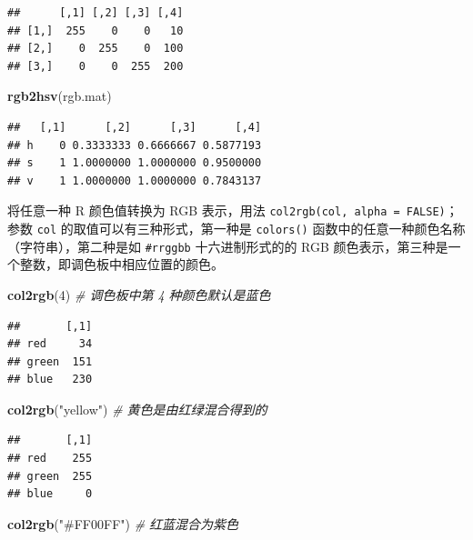 \documentclass[
  b5paper,
  UTF8,twoside]{book}
\newenvironment{Shaded}{\begin{snugshade}}{\end{snugshade}}
\newcommand{\CommentTok}[1]{\textcolor[rgb]{0.56,0.35,0.01}{\textit{#1}}}
\newcommand{\DecValTok}[1]{\textcolor[rgb]{0.00,0.00,0.81}{#1}}
\newcommand{\FunctionTok}[1]{\textcolor[rgb]{0.13,0.29,0.53}{\textbf{#1}}}
\newcommand{\NormalTok}[1]{#1}
\newcommand{\StringTok}[1]{\textcolor[rgb]{0.31,0.60,0.02}{#1}}
\providecommand{\tightlist}{%
  \setlength{\itemsep}{0pt}\setlength{\parskip}{0pt}}
\begin{document}
\begin{verbatim}
##      [,1] [,2] [,3] [,4]
## [1,]  255    0    0   10
## [2,]    0  255    0  100
## [3,]    0    0  255  200
\end{verbatim}

\begin{Shaded}
\begin{Highlighting}[]
\FunctionTok{rgb2hsv}\NormalTok{(rgb.mat)}
\end{Highlighting}
\end{Shaded}

\begin{verbatim}
##   [,1]      [,2]      [,3]      [,4]
## h    0 0.3333333 0.6666667 0.5877193
## s    1 1.0000000 1.0000000 0.9500000
## v    1 1.0000000 1.0000000 0.7843137
\end{verbatim}

\begin{description}
\tightlist
\item[\texttt{col2rgb()}]
将任意一种 R 颜色值转换为 RGB 表示，用法 \texttt{col2rgb(col,\ alpha\ =\ FALSE)}；参数 \texttt{col} 的取值可以有三种形式，第一种是 \texttt{colors()} 函数中的任意一种颜色名称（字符串），第二种是如 \texttt{\#rrggbb} 十六进制形式的的 RGB 颜色表示，第三种是一个整数，即调色板中相应位置的颜色。
\end{description}

\begin{Shaded}
\begin{Highlighting}[]
\FunctionTok{col2rgb}\NormalTok{(}\DecValTok{4}\NormalTok{) }\CommentTok{\# 调色板中第 4 种颜色默认是蓝色}
\end{Highlighting}
\end{Shaded}

\begin{verbatim}
##       [,1]
## red     34
## green  151
## blue   230
\end{verbatim}

\begin{Shaded}
\begin{Highlighting}[]
\FunctionTok{col2rgb}\NormalTok{(}\StringTok{"yellow"}\NormalTok{) }\CommentTok{\# 黄色是由红绿混合得到的}
\end{Highlighting}
\end{Shaded}

\begin{verbatim}
##       [,1]
## red    255
## green  255
## blue     0
\end{verbatim}

\begin{Shaded}
\begin{Highlighting}[]
\FunctionTok{col2rgb}\NormalTok{(}\StringTok{"\#FF00FF"}\NormalTok{) }\CommentTok{\# 红蓝混合为紫色}
\end{Highlighting}
\end{Shaded}
\end{document}
